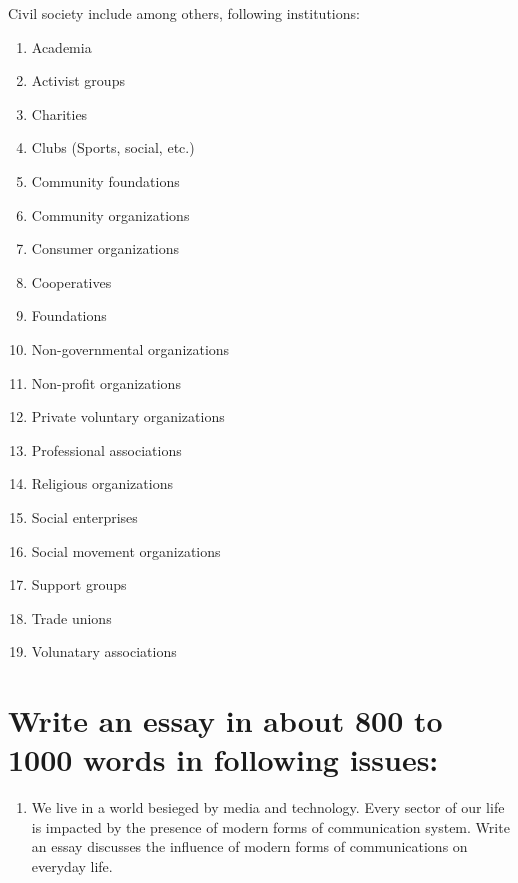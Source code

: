 \documentclass[
]{book}
\providecommand{\tightlist}{%
  \setlength{\itemsep}{0pt}\setlength{\parskip}{0pt}}
\begin{document}
Civil society include among others, following institutions:

\begin{enumerate}
\def\labelenumi{\arabic{enumi}.}
\tightlist
\item
  Academia
\item
  Activist groups
\item
  Charities
\item
  Clubs (Sports, social, etc.)
\item
  Community foundations
\item
  Community organizations
\item
  Consumer organizations
\item
  Cooperatives
\item
  Foundations
\item
  Non-governmental organizations
\item
  Non-profit organizations
\item
  Private voluntary organizations
\item
  Professional associations
\item
  Religious organizations
\item
  Social enterprises
\item
  Social movement organizations
\item
  Support groups
\item
  Trade unions
\item
  Volunatary associations
\end{enumerate}

\hypertarget{write-an-essay-in-about-800-to-1000-words-in-following-issues}{%
\section{Write an essay in about 800 to 1000 words in following issues:}\label{write-an-essay-in-about-800-to-1000-words-in-following-issues}}

\begin{enumerate}
\def\labelenumi{\arabic{enumi}.}
\tightlist
\item
  We live in a world besieged by media and technology. Every sector of our life is impacted by the presence of modern forms of communication system. Write an essay discusses the influence of modern forms of communications on everyday life.
\end{enumerate}
\end{document}

